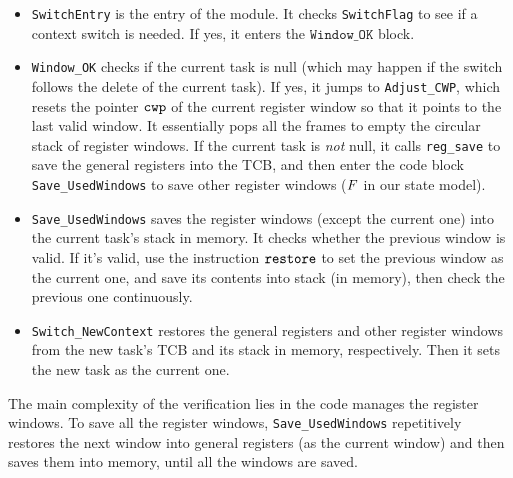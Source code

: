 \begin{itemize}
	\item
	\texttt{SwitchEntry}
    is the entry of the module.
	It checks {\tt SwitchFlag} to see if
    a context switch is needed. If yes,
    it enters the $\texttt{Window\_OK}$ block.
	
	\item
	\texttt{Window\_OK}
    checks if the current task is null (which may happen
    if the switch follows the delete of the current task).
    If yes, it jumps to \texttt{Adjust\_CWP}, which
    resets the pointer $\texttt{cwp}$ of the current register window
    so that it points to the last valid window. It essentially pops
    all the frames to empty the circular stack of register
    windows.
    If the current task is {\em not} null,
    it calls \texttt{reg\_save} to save the
    general registers into the TCB, and then
    enter the code block \texttt{Save\_UsedWindows}
    to save other register windows ($F$ in our
    state model).
	
	\item
	\texttt{Save\_UsedWindows} saves
	the register windows (except the current one)
    into the current task's stack in memory. 
    It checks whether the previous window is valid. 
    If it's valid, use the instruction $\texttt{restore}{}$ 
    to set the previous window as the current one, 
    and save its contents into stack (in memory), 
    then check the previous one continuously. 
	
	\item
	\texttt{Switch\_NewContext}
    restores the general registers and other register
    windows from the new task's TCB and its stack in memory,
    respectively. Then it sets the new task as
    the current one.
\end{itemize}

The main complexity of the verification lies in
the code manages the register windows.
%
To save all the register windows, \texttt{Save\_UsedWindows}
repetitively restores the next window into general registers
(as the current window)
and then saves them into memory, until all the windows are saved.

